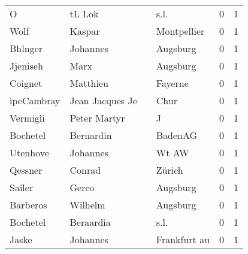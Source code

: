 \begin{center}
\begin{tiny}
\begin{longtabu}{llllrr}
                        O &                             tL Lok &             &                                        s.l. &          0 &         1 \\
                     Wolf &                             Kaspar &             &                                 Montpellier &          0 &         1 \\
                  Bhlnger &                           Johannes &             &                                    Augsburg &          0 &         1 \\
                 Jjeniseh &                               Marx &             &                                    Augsburg &          0 &         1 \\
                  Coignet &                           Matthieu &             &                                     Fayerne &          0 &         1 \\
               ipeCambray &                    Jean Jacques Je &             &                                        Chur &          0 &         1 \\
                 Vermigli &                       Peter Martyr &             &                                           J &          0 &         1 \\
                 Bochetel &                          Bernardin &             &                                     BadenAG &          0 &         1 \\
                 Utenhove &                           Johannes &             &                                       Wt AW &          0 &         1 \\
                  Qessner &                             Conrad &             &                                      Zürich &          0 &         1 \\
                   Sailer &                              Gereo &             &                                    Augsburg &          0 &         1 \\
                 Barberos &                            Wilhelm &             &                                    Augsburg &          0 &         1 \\
                 Bochetel &                          Beraardia &             &                                        s.l. &          0 &         1 \\
                    Jaske &                           Johannes &             &                                Frankfurt au &          0 &         1 \\

\end{longtabu}
\end{tiny}
\end{center}
